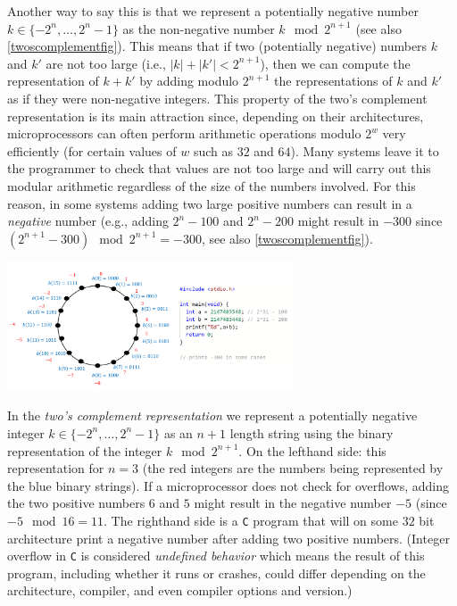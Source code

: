 Another way to say this is that we represent a potentially negative
number \(k \in \{ -2^n,\ldots, 2^n-1 \}\) as the non-negative number
\(k \mod 2^{n+1}\) (see also \cref{twoscomplementfig}). This means that
if two (potentially negative) numbers \(k\) and \(k'\) are not too large
(i.e., \(|k|+|k'|<2^{n+1}\)), then we can compute the representation of
\(k+k'\) by adding modulo \(2^{n+1}\) the representations of \(k\) and
\(k'\) as if they were non-negative integers. This property of the two's
complement representation is its main attraction since, depending on
their architectures, microprocessors can often perform arithmetic
operations modulo \(2^w\) very efficiently (for certain values of \(w\)
such as \(32\) and \(64\)). Many systems leave it to the programmer to
check that values are not too large and will carry out this modular
arithmetic regardless of the size of the numbers involved. For this
reason, in some systems adding two large positive numbers can result in
a \emph{negative} number (e.g., adding \(2^n-100\) and \(2^n-200\) might
result in \(-300\) since \((2^{n+1}-300) \mod 2^{n+1} = -300\), see also
\cref{twoscomplementfig}).


\begin{marginfigure}
\centering
\includegraphics[width=\linewidth, height=1.5in, keepaspectratio]{../figure/twoscomplement.png}
\caption{In the \emph{two's complement representation} we represent a
potentially negative integer \(k \in \{ -2^n ,\ldots, 2^n-1 \}\) as an
\(n+1\) length string using the binary representation of the integer
\(k \mod 2^{n+1}\). On the lefthand side: this representation for
\(n=3\) (the red integers are the numbers being represented by the blue
binary strings). If a microprocessor does not check for overflows,
adding the two positive numbers \(6\) and \(5\) might result in the
negative number \(-5\) (since \(-5 \mod 16 = 11\). The righthand side is
a \texttt{C} program that will on some \(32\) bit architecture print a
negative number after adding two positive numbers. (Integer overflow in
\texttt{C} is considered \emph{undefined behavior} which means the
result of this program, including whether it runs or crashes, could
differ depending on the architecture, compiler, and even compiler
options and version.)}
\label{twoscomplementfig}
\end{marginfigure}

